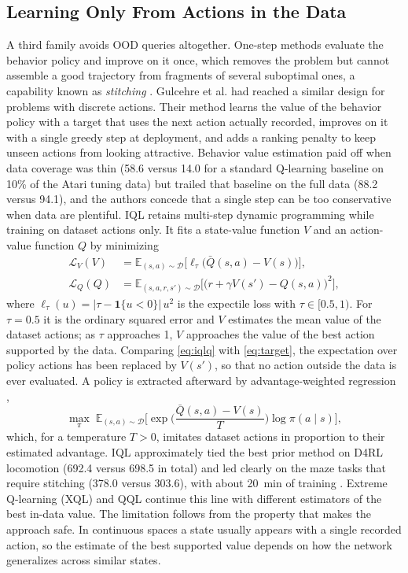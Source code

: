 \documentclass[conference]{IEEEtran}
\begin{document}
\subsection{Learning Only From Actions in the Data}
A third family avoids OOD queries altogether. One-step methods \cite{brandfonbrener2021onestep} evaluate the behavior policy and improve on it once, which removes the problem but cannot assemble a good trajectory from fragments of several suboptimal ones, a capability known as \emph{stitching} \cite{kostrikov2022iql}. Gulcehre et al. \cite{gulcehre2020brr} had reached a similar design for problems with discrete actions. Their method learns the value of the behavior policy with a target that uses the next action actually recorded, improves on it with a single greedy step at deployment, and adds a ranking penalty to keep unseen actions from looking attractive. Behavior value estimation paid off when data coverage was thin (58.6 versus 14.0 for a standard Q-learning baseline on 10\% of the Atari tuning data) but trailed that baseline on the full data (88.2 versus 94.1), and the authors concede that a single step can be too conservative when data are plentiful. IQL \cite{kostrikov2022iql} retains multi-step dynamic programming while training on dataset actions only. It fits a state-value function $V$ and an action-value function $Q$ by minimizing
\begin{align}
\mathcal{L}_V(V) &= \mathbb{E}_{(s,a) \sim \mathcal{D}}\big[\ell_\tau\big(\bar{Q}(s,a) - V(s)\big)\big], \label{eq:iqlv}\\
\mathcal{L}_Q(Q) &= \mathbb{E}_{(s,a,r,s') \sim \mathcal{D}}\big[\big(r + \gamma V(s') - Q(s,a)\big)^{2}\big], \label{eq:iqlq}
\end{align}
where $\ell_\tau(u) = |\tau - \mathbf{1}\{u < 0\}|\, u^{2}$ is the expectile loss with $\tau \in [0.5, 1)$. For $\tau = 0.5$ it is the ordinary squared error and $V$ estimates the mean value of the dataset actions; as $\tau$ approaches 1, $V$ approaches the value of the best action supported by the data. Comparing \eqref{eq:iqlq} with \eqref{eq:target}, the expectation over policy actions has been replaced by $V(s')$, so that no action outside the data is ever evaluated. A policy is extracted afterward by advantage-weighted regression \cite{peng2019awr},
\begin{equation}
\max_{\pi}\; \mathbb{E}_{(s,a) \sim \mathcal{D}}\Big[\exp\!\Big(\frac{\bar{Q}(s,a) - V(s)}{T}\Big) \log \pi(a \mid s)\Big],
\label{eq:awr}
\end{equation}
which, for a temperature $T > 0$, imitates dataset actions in proportion to their estimated advantage. IQL approximately tied the best prior method on D4RL locomotion (692.4 versus 698.5 in total) and led clearly on the maze tasks that require stitching (378.0 versus 303.6), with about 20~min of training \cite{kostrikov2022iql}. Extreme Q-learning (XQL) \cite{garg2023xql} and QQL \cite{gao2026qql} continue this line with different estimators of the best in-data value. The limitation follows from the property that makes the approach safe. In continuous spaces a state usually appears with a single recorded action, so the estimate of the best supported value depends on how the network generalizes across similar states.
\end{document}
